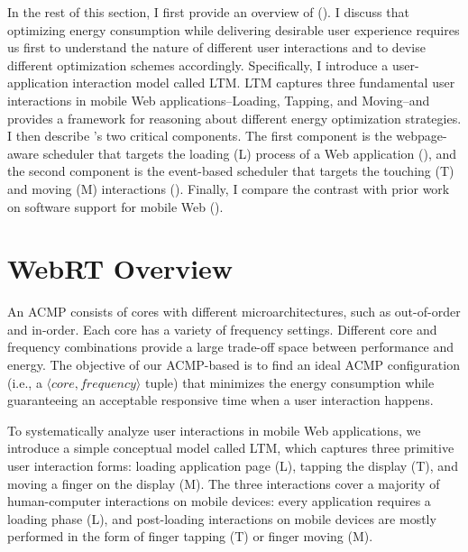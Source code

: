 In the rest of this section, I first provide an overview of \webrt (). I discuss that optimizing energy consumption while delivering desirable user experience requires us first to understand the nature of different user interactions and to devise different optimization schemes accordingly. Specifically, I introduce a user-application interaction model called LTM. LTM captures three fundamental user interactions in mobile Web applications--Loading, Tapping, and Moving--and provides a framework for reasoning about different energy optimization strategies. I then describe \webrt's two critical components. The first component is the webpage-aware scheduler that targets the loading (L) process of a Web application (), and the second component is the event-based scheduler that targets the touching (T) and moving (M) interactions (). Finally, I compare the contrast \webrt with prior work on software support for mobile Web ().

\section{WebRT Overview}
\label{sec:runtime:overview}

An ACMP consists of cores with different microarchitectures, such as out-of-order and in-order. Each core has a variety of frequency settings. Different core and frequency combinations provide a large trade-off space between performance and energy. The objective of our ACMP-based \webrt is to find an ideal ACMP configuration (i.e., a $\langle core, frequency \rangle$ tuple) that minimizes the energy consumption while guaranteeing an acceptable responsive time when a user interaction happens.

To systematically analyze user interactions in mobile Web applications, we introduce a simple conceptual model called LTM, which captures three primitive user interaction forms: loading application page (L), tapping the display (T), and moving a finger on the display (M). The three interactions cover a majority of human-computer interactions on mobile devices: every application requires a loading phase (L), and post-loading interactions on mobile devices are mostly performed in the form of finger tapping (T) or finger moving (M).


